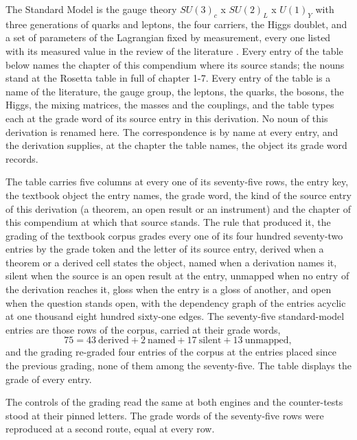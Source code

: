 \begin{chbridge}
The Standard Model is the gauge theory $SU(3)_c$ x $SU(2)_L$ x $U(1)_Y$ with three generations of quarks and leptons, the four carriers, the Higgs doublet, and a set of parameters of the Lagrangian fixed by measurement, every one listed with its measured value in the review of the literature \cite{Weinberg1967,Workman2022}. Every entry of the table below names the chapter of this compendium where its source stands; the nouns stand at the Rosetta table in full of chapter 1-7.
Every entry of the table is a name of the literature, the gauge group, the leptons, the quarks, the bosons, the Higgs, the mixing matrices, the masses and the couplings, and the table types each at the grade word of its source entry in this derivation. No noun of this derivation is renamed here. The correspondence is by name at every entry, and the derivation supplies, at the chapter the table names, the object its grade word records.
\end{chbridge}
\begin{chproof}[instrument]
The table carries five columns at every one of its seventy-five rows, the entry key, the textbook object the entry names, the grade word, the kind of the source entry of this derivation (a theorem, an open result or an instrument) and the chapter of this compendium at which that source stands. The rule that produced it, the grading of the textbook corpus grades every one of its four hundred seventy-two entries by the grade token and the letter of its source entry, derived when a theorem or a derived cell states the object, named when a derivation names it, silent when the source is an open result at the entry, unmapped when no entry of the derivation reaches it, gloss when the entry is a gloss of another, and open when the question stands open, with the dependency graph of the entries acyclic at one thousand eight hundred sixty-one edges. The seventy-five standard-model entries are those rows of the corpus, carried at their grade words,
\begin{equation}
75 = 43 \ \text{derived} + 2 \ \text{named} + 17 \ \text{silent} + 13 \ \text{unmapped} ,
\end{equation}
and the grading re-graded four entries of the corpus at the entries placed since the previous grading, none of them among the seventy-five. The table displays the grade of every entry.

The controls of the grading read the same at both engines and the counter-tests stood at their pinned letters. The grade words of the seventy-five rows were reproduced at a second route, equal at every row.
\end{chproof}


